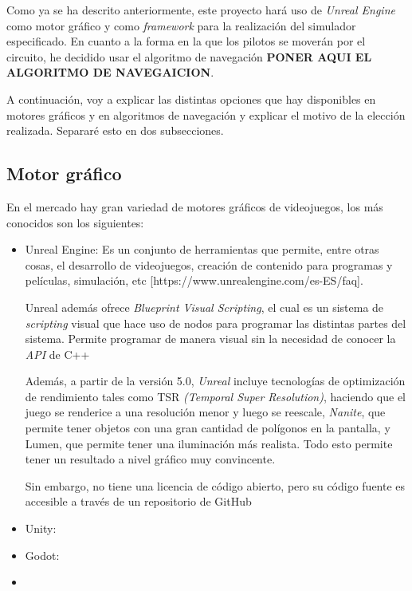 \documentclass[a4paper,11pt]{book}
\begin{document}
Como ya se ha descrito anteriormente, este proyecto hará uso de \textit{Unreal Engine} como motor gráfico y como \textit{framework} para la realización del simulador especificado. En cuanto a la forma en la que los pilotos se moverán por el circuito, he decidido usar el algoritmo de navegación \textbf{PONER AQUI EL ALGORITMO DE NAVEGAICION}.

\bigskip

A continuación, voy a explicar las distintas opciones que hay disponibles en motores gráficos y en algoritmos de navegación y explicar el motivo de la elección realizada. Separaré esto en dos subsecciones.

\subsection{Motor gráfico}
En el mercado hay gran variedad de motores gráficos de videojuegos, los más conocidos son los siguientes:

\begin{itemize}
   \item Unreal Engine: Es un conjunto de herramientas que permite, entre otras cosas, el desarrollo de videojuegos, creación de contenido para programas y películas, simulación, etc [https://www.unrealengine.com/es-ES/faq]. 
   
   Unreal además ofrece \textit{Blueprint Visual Scripting}, el cual es un sistema de \textit{scripting} visual que hace uso de nodos para programar las distintas partes del sistema. Permite programar de manera visual sin la necesidad de conocer la \textit{API} de C++ %


   Además, a partir de la versión 5.0, \textit{Unreal} incluye tecnologías de optimización de rendimiento tales como TSR \textit{(Temporal Super Resolution)}, haciendo que el juego se renderice a una resolución menor y luego se reescale, \textit{Nanite}, que permite tener objetos con una gran cantidad de polígonos en la pantalla, y Lumen, que permite tener una iluminación más realista. %
   Todo esto permite tener un resultado a nivel gráfico muy convincente.

   Sin embargo, no tiene una licencia de código abierto, pero su código fuente es accesible a través de un repositorio de GitHub %
   
   \item Unity:
   \item Godot:
   \item 
\end{itemize}
\end{document}

